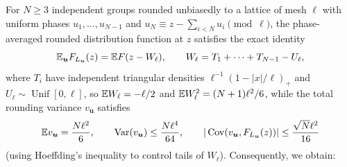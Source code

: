 For $N\ge3$ independent groups rounded unbiasedly to a lattice of mesh
$\ell$ with uniform phases $u_1,\ldots,u_{N-1}$ and $u_N\equiv z-\sum_{i<N}u_i\pmod\ell$,
the phase-averaged rounded distribution function at $z$ satisfies the exact
identity
\begin{equation}\label{eq:weighted-phase-identity}
 \mathbb E_{\boldsymbol u}F_{L_{\boldsymbol u}}(z)
       =\mathbb E F(z-W_\ell),\qquad
 W_\ell=T_1+\cdots+T_{N-1}-U_\ell,
\end{equation}
where $T_i$ have independent triangular densities $\ell^{-1}(1-|x|/\ell)_+$
and $U_\ell\sim\operatorname{Unif}[0,\ell]$, so $\mathbb E W_\ell=-\ell/2$ and
$\mathbb E W_\ell^2=(N+1)\ell^2/6$, while the total rounding variance
$v_{\boldsymbol u}$ satisfies
\begin{equation}\label{eq:weighted-phase-variance}
 \mathbb E v_{\boldsymbol u}=\frac{N\ell^2}{6},\qquad
 \operatorname{Var}(v_{\boldsymbol u})\le \frac{N\ell^4}{64},\qquad
 |\operatorname{Cov}(v_{\boldsymbol u},F_{L_{\boldsymbol u}}(z))|
                                                    \le\frac{\sqrt N\ell^2}{16}
\end{equation}
(using Hoeffding's inequality \citep{Hoeffding1963} to control tails of
$W_\ell$). Consequently, we obtain:

